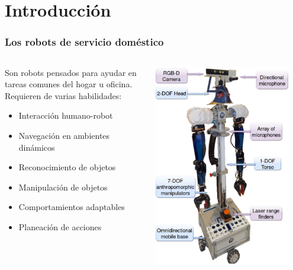 
\section{Introducción}
\begin{frame}\frametitle{Los robots de servicio doméstico}
  \begin{columns}
    \begin{column}{0.5\textwidth}
      Son robots pensados para ayudar en tareas comunes del hogar u oficina. Requieren de varias habilidades:
      \begin{itemize}
      \item Interacción humano-robot
      \item Navegación en ambientes dinámicos
      \item Reconocimiento de objetos
      \item Manipulación de objetos
      \item Comportamientos adaptables
      \item Planeación de acciones
      \end{itemize}
    \end{column}
    \begin{column}{0.4\textwidth}
      \centering
      \includegraphics[width=0.9\textwidth]{Figures/Justina.pdf}
    \end{column}
  \end{columns}
\end{frame}

